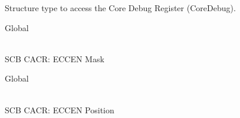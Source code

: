 \begin{DoxyRefList}
\label{deprecated__deprecated000557}%
%
Structure type to access the Core Debug Register (Core\+Debug).  
\item[{\parbox[t]{\linewidth}{Global \doxylink{group___c_m_s_i_s___s_c_b_ga7456a0b93710e8b9fa2b94c946e96c5c}{SCB\+\_\+\+CACR\+\_\+\+ECCEN\+\_\+\+Msk} }}]\hfill \\
\label{deprecated__deprecated000556}%
%
SCB CACR\+: ECCEN Mask  
\item[{\parbox[t]{\linewidth}{Global \doxylink{group___c_m_s_i_s___s_c_b_ga76ce5adcbed2d2d8d425214a1e5d0579}{SCB\+\_\+\+CACR\+\_\+\+ECCEN\+\_\+\+Pos} }}]\hfill \\
\label{deprecated__deprecated000555}%
%
SCB CACR\+: ECCEN Position 
\end{DoxyRefList}